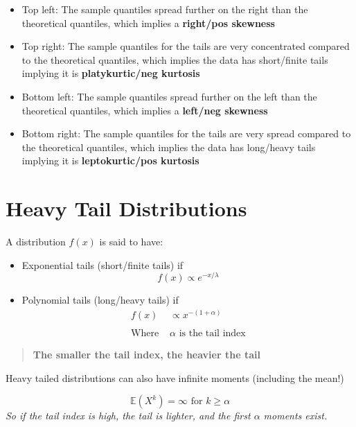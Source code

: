 \documentclass[
  oneside]{book}
\providecommand{\tightlist}{%
  \setlength{\itemsep}{0pt}\setlength{\parskip}{0pt}}
\begin{document}
\begin{itemize}
\tightlist
\item
  Top left: The sample quantiles spread further on the right than the theoretical quantiles, which implies a \textbf{right/pos skewness}
\item
  Top right: The sample quantiles for the tails are very concentrated compared to the theoretical quantiles, which implies the data has short/finite tails implying it is \textbf{platykurtic/neg kurtosis}
\item
  Bottom left: The sample quantiles spread further on the left than the theoretical quantiles, which implies a \textbf{left/neg skewness}
\item
  Bottom right: The sample quantiles for the tails are very spread compared to the theoretical quantiles, which implies the data has long/heavy tails implying it is \textbf{leptokurtic/pos kurtosis}
\end{itemize}

\hypertarget{heavy-tail-distributions}{%
\section{Heavy Tail Distributions}\label{heavy-tail-distributions}}

A distribution \(f(x)\) is said to have:

\begin{itemize}
\tightlist
\item
  Exponential tails (short/finite tails) if
  \[f(x) \propto e^{-x/\lambda}\]
\item
  Polynomial tails (long/heavy tails) if
  \[
  \begin{aligned}
  f(x) &\propto x^{-(1+\alpha)}\\
  \\
  \text{Where } &\alpha \text{ is the tail index}
  \end{aligned}
  \]
\end{itemize}

\begin{quote}
\textbf{The smaller the tail index, the heavier the tail}
\end{quote}

Heavy tailed distributions can also have infinite moments (including the mean!)

\[
\mathbb{E}(X^{k}) = \infty \text{ for } k \geq \alpha
\]
\emph{So if the tail index is high, the tail is lighter, and the first \(\alpha\) moments exist.}
\end{document}
